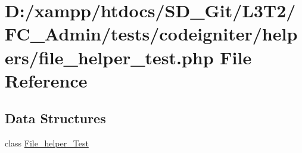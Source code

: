 \hypertarget{_admin_2tests_2codeigniter_2helpers_2file__helper__test_8php}{}\section{D\+:/xampp/htdocs/\+S\+D\+\_\+\+Git/\+L3\+T2/\+F\+C\+\_\+\+Admin/tests/codeigniter/helpers/file\+\_\+helper\+\_\+test.php File Reference}
\label{_admin_2tests_2codeigniter_2helpers_2file__helper__test_8php}
\subsection*{Data Structures}
\begin{DoxyCompactItemize}
\item 
class \hyperlink{class_file__helper___test}{File\+\_\+helper\+\_\+\+Test}
\end{DoxyCompactItemize}
